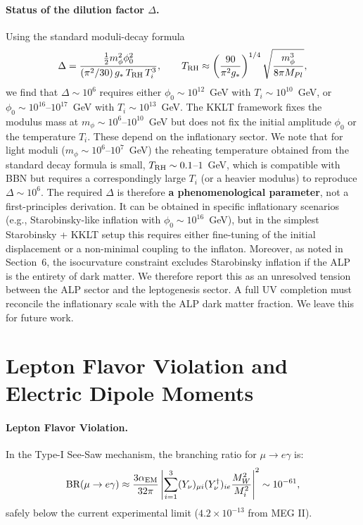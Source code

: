 \documentclass[12pt,a4paper]{article}
\numberwithin{equation}{section}
\begin{document}
\paragraph{Status of the dilution factor \(\Delta\).}
Using the standard moduli-decay formula
\begin{equation}
\Delta = \frac{\tfrac12 m_\phi^2 \phi_0^2}
{(\pi^2/30)\,g_*\,T_{\rm RH}\,T_i^3},
\qquad
T_{\rm RH} \approx \left(\frac{90}{\pi^2 g_*}\right)^{1/4}
\sqrt{\frac{m_\phi^3}{8\pi M_{Pl}}},
\end{equation}
we find that \(\Delta \sim 10^6\) requires either \(\phi_0 \sim 10^{12}\)~GeV with \(T_i \sim 10^{10}\)~GeV, or \(\phi_0 \sim 10^{16}\)--\(10^{17}\)~GeV with \(T_i \sim 10^{13}\)~GeV. The KKLT framework fixes the modulus mass at \(m_\phi \sim 10^6\)--\(10^{10}\)~GeV but does not fix the initial amplitude \(\phi_0\) or the temperature \(T_i\). These depend on the inflationary sector. We note that for light moduli (\(m_\phi \sim 10^6\)--\(10^7\)~GeV) the reheating temperature obtained from the standard decay formula is small, \(T_{\rm RH} \sim 0.1\)--\(1\)~GeV, which is compatible with BBN but requires a correspondingly large \(T_i\) (or a heavier modulus) to reproduce \(\Delta \sim 10^6\). The required \(\Delta\) is therefore \textbf{a phenomenological parameter}, not a first-principles derivation. It can be obtained in specific inflationary scenarios (e.g., Starobinsky-like inflation with \(\phi_0 \sim 10^{16}\)~GeV), but in the simplest Starobinsky + KKLT setup this requires either fine-tuning of the initial displacement or a non-minimal coupling to the inflaton. Moreover, as noted in Section~6, the isocurvature constraint excludes Starobinsky inflation if the ALP is the entirety of dark matter. We therefore report this as an unresolved tension between the ALP sector and the leptogenesis sector. A full UV completion must reconcile the inflationary scale with the ALP dark matter fraction. We leave this for future work.

\section{Lepton Flavor Violation and Electric Dipole Moments}
\label{sec:lfv_edm}
\paragraph{Lepton Flavor Violation.}
In the Type-I See-Saw mechanism, the branching ratio for \(\mu \to e \gamma\) is:
\begin{equation}
\text{BR}(\mu \to e \gamma) \approx \frac{3\alpha_{\rm EM}}{32\pi} \left| \sum_{i=1}^3 (Y_\nu)_{\mu i} (Y_\nu^\dagger)_{i e} \frac{M_W^2}{M_i^2} \right|^2 \sim 10^{-61},
\end{equation}
safely below the current experimental limit (\(4.2 \times 10^{-13}\) from MEG II).
\end{document}
